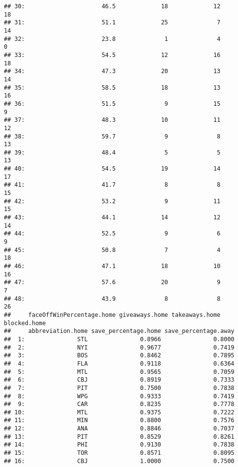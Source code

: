 \documentclass[
]{article}
\begin{document}
\begin{verbatim}
## 30:                      46.5             18             12           18
## 31:                      51.1             25              7           14
## 32:                      23.8              1              4            0
## 33:                      54.5             12             16           18
## 34:                      47.3             20             13           14
## 35:                      58.5             18             13           16
## 36:                      51.5              9             15            9
## 37:                      48.3             10             11           12
## 38:                      59.7              9              8           13
## 39:                      48.4              5              5           13
## 40:                      54.5             19             14           17
## 41:                      41.7              8              8           15
## 42:                      53.2              9             11           15
## 43:                      44.1             14             12           14
## 44:                      52.5              9              6            9
## 45:                      50.8              7              4           18
## 46:                      47.1             18             10           16
## 47:                      57.6             20              9            7
## 48:                      43.9              8              8           26
##     faceOffWinPercentage.home giveaways.home takeaways.home blocked.home
##     abbreviation.home save_percentage.home save_percentage.away
##  1:               STL               0.8966               0.8000
##  2:               NYI               0.9677               0.7419
##  3:               BOS               0.8462               0.7895
##  4:               FLA               0.9118               0.6364
##  5:               MTL               0.9565               0.7059
##  6:               CBJ               0.8919               0.7333
##  7:               PIT               0.7500               0.7838
##  8:               WPG               0.9333               0.7419
##  9:               CAR               0.8235               0.7778
## 10:               MTL               0.9375               0.7222
## 11:               MIN               0.8800               0.7576
## 12:               ANA               0.8846               0.7037
## 13:               PIT               0.8529               0.8261
## 14:               PHI               0.9130               0.7838
## 15:               TOR               0.8571               0.8095
## 16:               CBJ               1.0000               0.7500

\end{verbatim}
\end{document}
